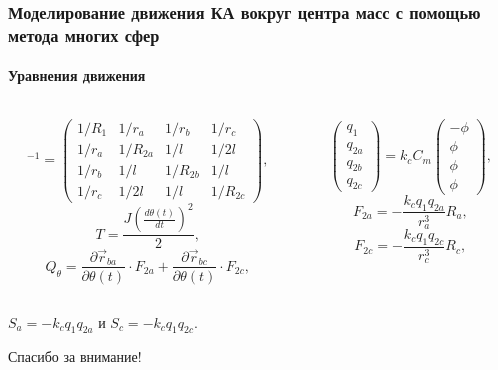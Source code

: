 \documentclass[10pt,pdf,hyperref={unicode}]{beamer}
\begin{document}
\begin{frame}
\frametitle{Моделирование движения КА вокруг центра масс с помощью метода многих сфер}
\framesubtitle{Уравнения движения}
\begin{columns}[onlytextwidth]
	\begin{column}{0.5\textwidth}
	\begin{equation*}
		[C_m]^{-1} = 
		\begin{pmatrix}
			1/R_1	&	1/r_a	&	1/r_b	&	1/r_c\\
			1/r_a	&	1/R_{2a}	&	1/l		&	1/2l\\
			1/r_b	&	1/l		&	1/R_{2b}	&	1/l\\
			1/r_c	&	1/2l		&	1/l		&	1/R_{2c}
		\end{pmatrix},
	\end{equation*}	
	\begin{equation*}
		T = \frac{J \left(\frac{d \theta (t)}{dt}\right)^2}{2},
	\end{equation*}
	\begin{equation*}
		Q_\theta = \frac{\partial \vec{r}_{ba}}{\partial \theta(t)} \cdot F_{2a} + \frac{\partial \vec{r}_{bc}}{\partial \theta(t)} \cdot F_{2c},
	\end{equation*}
	\end{column}
	\begin{column}{0.5\textwidth}
	\begin{equation*}
		\begin{pmatrix}
			q_1\\
			q_{2a}\\
			q_{2b}\\
			q_{2c}
		\end{pmatrix}
		= k_c C_m 
		\begin{pmatrix}
			-\phi\\
			\phi\\
			\phi\\
			\phi
		\end{pmatrix},
	\end{equation*}
	\begin{equation*}
		F_{2a} = - \frac{k_c q_1 q_{2a}}{r_a^3}  R_a,
	\end{equation*}
	\begin{equation*}
		F_{2c} = - \frac{k_c q_1 q_{2c}}{r_c^3} R_c,
	\end{equation*}
	\end{column}
\end{columns}
\begin{center}
$S_a = - k_c q_1 q_{2a}$ и $S_c = - k_c q_1 q_{2c}$.
\end{center}
\end{frame}

\begin{frame}
	\begin{center}
		Спасибо за внимание!
	\end{center}
\end{frame}
\end{document}

